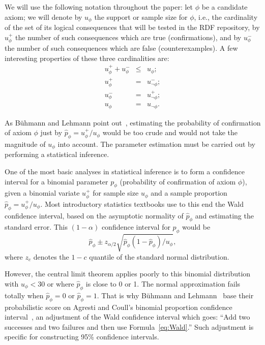 \documentclass{llncs}
\begin{document}
We will use the following notation throughout the paper:
let $\phi$ be a candidate axiom; we will denote by $u_\phi$ the support or sample size for $\phi$,
i.e., the cardinality of the set of its logical consequences that will be tested in the RDF repository,
by $u_\phi^+$ the number of such consequences which are true (confirmations), and
by $u_\phi^-$ the number of such consequences which are false (counterexamples).
A few interesting properties of these three cardinalities are:
\begin{eqnarray}
  u_\phi^+ + u_\phi^- &\leq& u_\phi;\label{eq:conf-pls-expt-lt-refc} \\
  u_\phi^+ &=& u_{\neg\phi}^-; \\
  u_\phi^- &=& u_{\neg\phi}^+; \\
  u_\phi &=& u_{\neg\phi}.
\end{eqnarray}


As B\"uhmann and Lehmann point out~\cite{BuehmannLehmann2012},
estimating the probability of confirmation of axiom $\phi$ just by $\hat{p}_\phi = u_\phi^+/u_\phi$
would be too crude and would not take the magnitude of $u_\phi$ into account.
The parameter estimation must be carried out by performing a statistical inference.

One of the most basic analyses in statistical inference is to form a confidence interval
for a binomial parameter $p_\phi$ (probability of confirmation of axiom $\phi$), given
a binomial variate $u_\phi^+$ for sample size $u_\phi$ and a sample proportion $\hat{p}_\phi = u_\phi^+/u_\phi$.
Most introductory statistics textbooks use to this end the Wald confidence interval,
based on the asymptotic normality of $\hat{p}_\phi$ and estimating the standard error.
This $(1 - \alpha)$ confidence interval for $p_\phi$ would be
\begin{equation}\label{eq:Wald}
  \hat{p}_\phi \pm z_{\alpha/2}\sqrt{\hat{p}_\phi(1 - \hat{p}_\phi)/u_\phi},
\end{equation}
where $z_c$ denotes the $1 - c$ quantile of the standard normal distribution.

However, the central limit theorem applies poorly to this binomial distribution
with $u_\phi<30$ or where $\hat{p}_\phi$ is close to 0 or 1.
The normal approximation fails totally when $\hat{p}_\phi = 0$ or $\hat{p}_\phi = 1$.
That is why B\"uhmann and Lehmann~\cite{BuehmannLehmann2012} base their probabilistic score
on Agresti and Coull's binomial proportion confidence interval~\cite{AgrestiCoull1998},
an adjustment of the Wald confidence interval which goes: ``Add two successes and two failures
and then use Formula~\ref{eq:Wald}.'' Such adjustment is specific for constructing
95\% confidence intervals.
\end{document}
